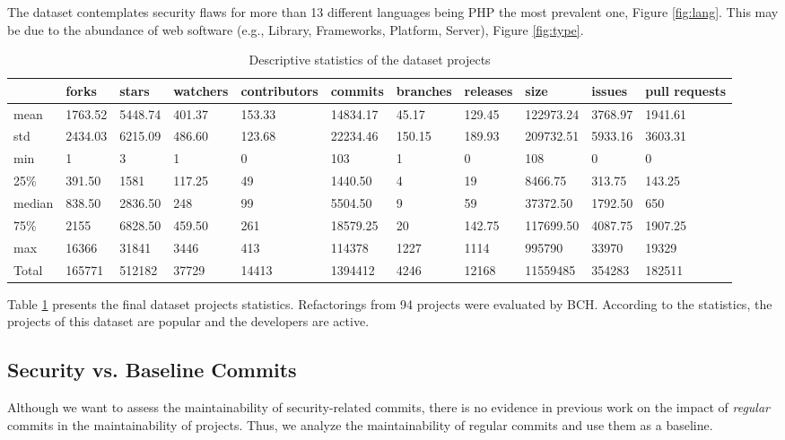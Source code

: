 \documentclass[10pt,conference]{IEEEtran}
\begin{document}
The dataset contemplates security flaws for more than 13 different languages being PHP the most prevalent one, Figure \ref{fig:lang}. This may be due to the abundance of web software (e.g., Library, Frameworks, Platform, Server), Figure \ref{fig:type}. 

\begin{table}[h]
	\centering
	\caption{Descriptive statistics of the dataset projects}
\begin{tabular}{@{}lllllllllll@{}}
\toprule
      & forks   & stars   & watchers & contributors & commits  & branches & releases & size      & issues & pull requests  \\ \midrule
mean  & 1763.52 & 5448.74 & 401.37   & 153.33       & 14834.17 & 45.17    & 129.45   & 122973.24 & 3768.97   & 1941.61 \\
std   & 2434.03 & 6215.09 & 486.60   & 123.68       & 22234.46 & 150.15   & 189.93   & 209732.51 & 5933.16   & 3603.31 \\
min   & 1       & 3       & 1        & 0            & 103      & 1        & 0        & 108       & 0         & 0       \\
25\%  & 391.50  & 1581    & 117.25   & 49           & 1440.50  & 4        & 19       & 8466.75   & 313.75    & 143.25  \\
median  & 838.50  & 2836.50 & 248      & 99           & 5504.50  & 9        & 59       & 37372.50  & 1792.50   & 650     \\
75\%  & 2155    & 6828.50 & 459.50   & 261          & 18579.25 & 20       & 142.75   & 117699.50 & 4087.75   & 1907.25 \\
max   & 16366   & 31841   & 3446     & 413          & 114378   & 1227     & 1114     & 995790    & 33970     & 19329   \\
Total & 165771  & 512182  & 37729    & 14413        & 1394412  & 4246     & 12168    & 11559485  & 354283    & 182511  \\ \bottomrule
\end{tabular}
\label{tab:dataset}
\end{table}

Table \ref{tab:dataset} presents the final dataset projects statistics. Refactorings from 94 projects were evaluated by BCH. According to the statistics, the projects of this dataset are \textcolor{mypink3}{popular and the developers are active}. 

\subsection{Security vs. Baseline Commits}
%
Although we want to assess the maintainability of security-related commits,
\textcolor{mypink3}{there is no evidence in previous work on the impact of \textit{regular} commits
in the maintainability of projects}. Thus, we analyze the maintainability of
regular commits and use them as a baseline.
\end{document}
